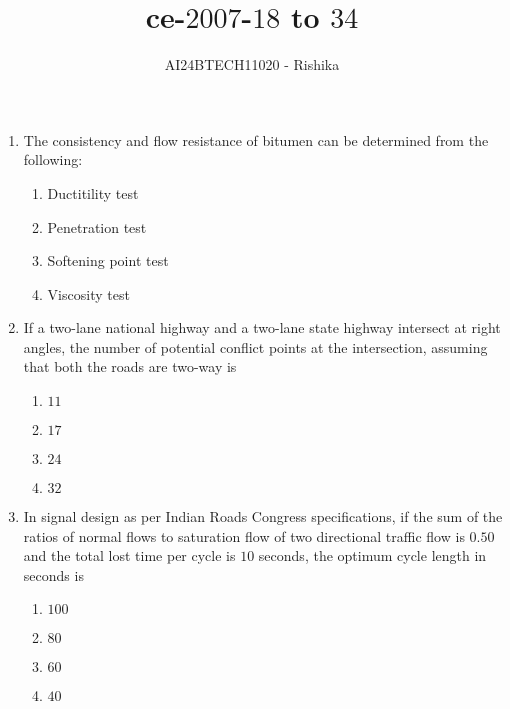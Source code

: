 \documentclass[journal,12pt,onecolumn]{IEEEtran}
\theoremstyle{remark}
\begin{document}

\vspace{3cm}

\title{ce-$2007$-$18$ to $34$}
\author{AI24BTECH11020 - Rishika}
\maketitle
\bigskip
\renewcommand{\thefigure}{\theenumi}
\renewcommand{\thetable}{\theenumi}
\begin{enumerate}[start=18]
	\item The consistency and flow resistance of bitumen can be determined from the following:
	\begin{enumerate}
		\item Ductitility test
		\item Penetration test
		\item Softening point test
		\item Viscosity test
	\end{enumerate}
\item If a two-lane national highway and a two-lane state highway intersect at right angles, the number of potential conflict points at the intersection, assuming that both the roads are two-way is 
	\begin{enumerate}
                \item $11$
                \item $17$
		\item $24$
                \item $32$
        \end{enumerate}
\item In signal design as per Indian Roads Congress specifications, if the sum of the ratios of normal flows to saturation flow of two directional traffic flow is $0.50$ and the total lost time per cycle is $10$ seconds, the optimum cycle length in seconds is 
	\begin{enumerate}
                \item $100$
                \item $80$
                \item $60$
                \item $40$
        \end{enumerate}

\end{enumerate}
\end{document}

